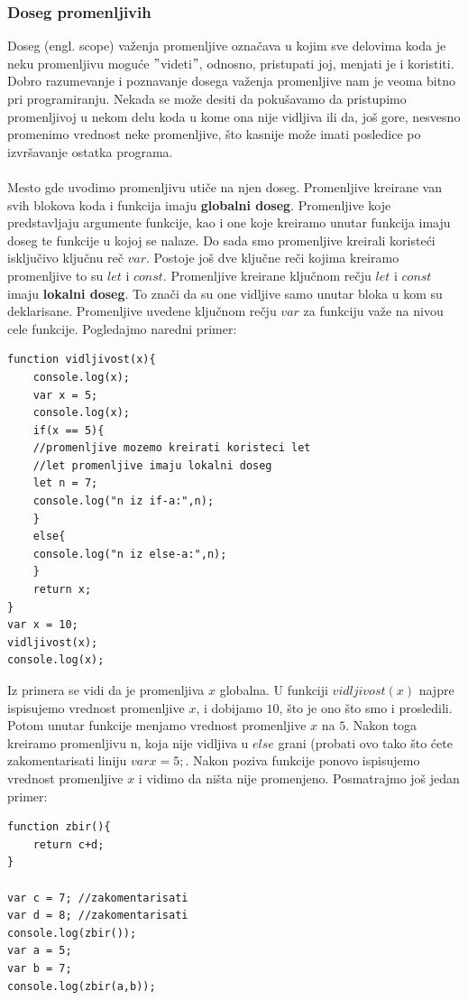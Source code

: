\documentclass[a4paper]{article}
\begin{document}
\subsubsection{Doseg promenljivih}
Doseg (engl. scope) važenja promenljive označava u kojim sve delovima koda je neku promenljivu moguće $"$videti$"$, odnosno, pristupati joj, menjati je i koristiti. Dobro razumevanje i poznavanje dosega važenja promenljive nam je veoma bitno pri programiranju. Nekada se može desiti da pokušavamo da pristupimo promenljivoj u nekom delu koda u kome ona nije vidljiva ili da, još gore, nesvesno promenimo vrednost neke promenljive, što kasnije može imati posledice po izvršavanje ostatka programa.\\\\
Mesto gde uvodimo promenljivu utiče na njen doseg. Promenljive kreirane van svih blokova koda i funkcija imaju \textbf{globalni doseg}. Promenljive koje predstavljaju argumente funkcije, kao i one koje kreiramo unutar funkcija imaju doseg te funkcije u kojoj se nalaze.
Do sada smo promenljive kreirali koristeći isključivo ključnu reč $var$. Postoje još dve ključne reči kojima kreiramo promenljive to su $let$ i $const$. Promenljive kreirane ključnom rečju $let$ i $const$ imaju \textbf{lokalni doseg}. To znači da su one vidljive samo unutar bloka u kom su deklarisane. Promenljive uvedene ključnom rečju $var$ za funkciju važe na nivou cele funkcije. Pogledajmo naredni primer:
\begin{lstlisting}[backgroundcolor = \color{lightgray}]
function vidljivost(x){
	console.log(x);
    var x = 5;
	console.log(x);
    if(x == 5){
	//promenljive mozemo kreirati koristeci let
	//let promenljive imaju lokalni doseg
	let n = 7;
	console.log("n iz if-a:",n);
	}
    else{
	console.log("n iz else-a:",n);   
    }
    return x;
}
var x = 10;
vidljivost(x);
console.log(x);
\end{lstlisting}
Iz primera se vidi da je promenljiva $x$ globalna. U funkciji $vidljivost(x)$ najpre ispisujemo vrednost promenljive $x$, i dobijamo $10$, što je ono što smo i prosledili. Potom unutar funkcije menjamo vrednost promenljive $x$ na $5$. Nakon toga kreiramo promenljivu n, koja nije vidljiva u $else$ grani (probati ovo tako što ćete zakomentarisati liniju $var x = 5;$. Nakon poziva funkcije ponovo ispisujemo vrednost promenljive $x$ i vidimo da ništa nije promenjeno. Posmatrajmo još jedan primer:
\begin{lstlisting}[backgroundcolor = \color{lightgray}]
function zbir(){
	return c+d;
}

var c = 7; //zakomentarisati
var d = 8; //zakomentarisati
console.log(zbir());
var a = 5;
var b = 7;
console.log(zbir(a,b));
\end{lstlisting}
\end{document}
